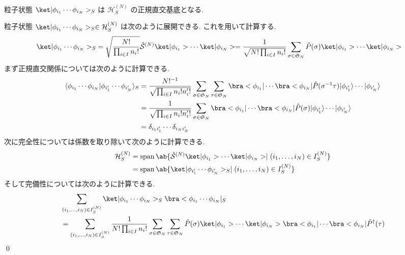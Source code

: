 \documentclass[uplatex,dvipdfmx,a4paper,11pt]{jlreq}
\makeatletter
\DeclareMathOperator{\Span}{span}
\newcommand{\HH}{\mathcal{H}}
\renewcommand{\SS}{\mathfrak{S}}
\renewcommand{\S}{\mathcal{S}}
\numberwithin{equation}{section}
\theoremstyle{definition}
\renewenvironment{proof}[1][\proofname]{\par
  \normalfont
  \topsep6\p@\@plus6\p@ \trivlist
  \item[\hskip\labelsep{\bfseries #1}\@addpunct{\bfseries}]\ignorespaces\quad\par
}{%
  \qed\endtrivlist\@endpefalse
}
\renewcommand\proofname{証明}
\makeatother
\begin{document}
\begin{proposition}[Q21-20(iv)(v)(vi)]
  粒子状態 $\ket|\phi_{i_1}\cdots\phi_{i_N}>_S$ は $\HH_S^{(N)}$ の正規直交基底となる.
\end{proposition}
\begin{proof}
  粒子状態 $\ket|\phi_{i_1}\cdots\phi_{i_N}>_S\in\HH_S^{(N)}$ は次のように展開できる. これを用いて計算する.
  \begin{align}
    \ket|\phi_{i_1}\cdots\phi_{i_N}>_S & = \sqrt{\frac{N!}{\prod_{i\in I}n_i!}}\hat{\S}^{(N)}\ket|\phi_{i_1}>\cdots\ket|\phi_{i_N}> = \frac{1}{\sqrt{N!\prod_{i\in I}n_i!}}\sum_{\sigma\in\SS_N}\hat{P}(\sigma)\ket|\phi_{i_1}>\cdots\ket|\phi_{i_N}>
  \end{align}
  まず正規直交関係については次のように計算できる.
  \begin{align}
    \langle\phi_{i_1}\cdots\phi_{i_N}|\phi_{i_1'}\cdots\phi_{i_N'}\rangle_S & = \frac{N!^{-1}}{\sqrt{\prod_{i\in I}n_i!n_i'!}}\sum_{\sigma\in\SS_N}\sum_{\tau\in\SS_N}\bra<\phi_{i_1}|\cdots\bra<\phi_{i_N}|\hat{P}(\sigma^{-1}\tau)|\phi_{i_1'}\rangle\cdots|\phi_{i_N'}\rangle \\
                                                                            & = \frac{1}{\sqrt{\prod_{i\in I}n_i!n_i'!}}\sum_{\sigma\in\SS_N}\bra<\phi_{i_1}|\cdots\bra<\phi_{i_N}|\hat{P}(\sigma)|\phi_{i_1'}\rangle\cdots|\phi_{i_N'}\rangle                                   \\
                                                                            & = \delta_{i_1i_1'}\cdots\delta_{i_Ni_N'}
  \end{align}
  次に完全性については係数を取り除いて次のように計算できる.
  \begin{align}
    \HH_S^{(N)} & = \Span\ab\{\hat{\S}^{(N)}\ket|\phi_{i_1}>\cdots\ket|\phi_{i_N}> \mid (i_1,\ldots,i_N)\in I_S^{(N)} \} \\
                & = \Span\ab\{\ket|\phi_{i_1'}\cdots\phi_{i_N'}>_S \mid (i_1,\ldots,i_N)\in I_S^{(N)} \}
  \end{align}
  そして完備性については次のように計算できる.
  \begin{align}
     & \sum_{(i_1,\ldots,i_N)\in I_S^{(N)}}\ket|\phi_{i_1}\cdots\phi_{i_N}>_S\bra<\phi_{i_1}\cdots\phi_{i_N}|_S                                                                                                                     \\
     & = \sum_{(i_1,\ldots,i_N)\in I_S^{(N)}}\frac{1}{N!\prod_{i\in I}n_i!}\sum_{\sigma\in\SS_N}\sum_{\tau\in\SS_N}\hat{P}(\sigma)\ket|\phi_{i_1}>\cdots\ket|\phi_{i_N}>\bra<\phi_{i_1}|\cdots\bra<\phi_{i_N}|\hat{P}^\dagger(\tau) \\

\end{align}
\end{proof}
\end{document}
